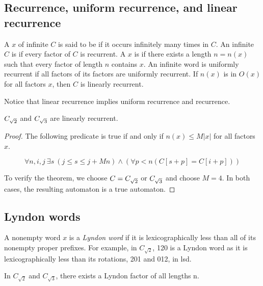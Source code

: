 \subsection{Recurrence, uniform recurrence, and linear recurrence}
A \factor $x$ of infinite \word $C$ is said to be  if it occurs infinitely many times in $C$. 
An infinite \word $C$ is  if every factor of $C$ is recurrent. 
A \factor $x$ is  if there exists a length $n = n(x)$ such that every factor of length $n$ contains $x$.
An infinite word is uniformly recurrent if all factors of its factors are uniformly recurrent.
If $n(x)$ is in $O(x)$ for all factors $x$, then $C$ is linearly recurrent. 

Notice that linear recurrence implies uniform recurrence and recurrence.

\begin{theorem}
$C_{\sqrt{2}}$ and $C_{\sqrt{3}}$ are linearly recurrent. 
\end{theorem}

\begin{proof}
The following predicate is true if and only if $n(x) \leq M|x|$ for all factors $x$.

\[\forall n,i,j ~\exists s ~(j\le s\le j+Mn) \wedge (\forall p<n (C[s+p] = C[i+p]))\]

To verify the theorem, we choose $C = C_{\sqrt{2}}$ or $C_{\sqrt{3}}$ and choose $M=4$. In both cases, the resulting automaton is a true automaton.  
\end{proof}

\subsection{Lyndon words}

A nonempty word $x$ is a \textit{Lyndon word} if it is lexicographically less than all of its nonempty proper prefixes. For example, in $C_{\sqrt{2}}$, 120 is a Lyndon word as it is lexicographically less than its rotations, 201 and 012, in lsd.

\begin{theorem}
In $C_{\sqrt{2}}$ and $C_{\sqrt{3}}$, there exists a Lyndon factor of all lengths n.
\end{theorem}

